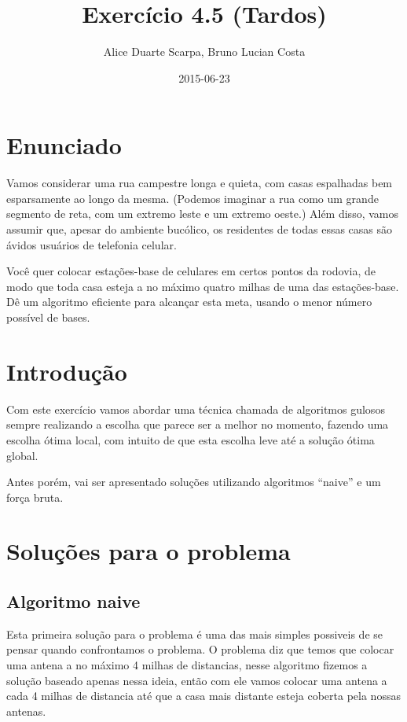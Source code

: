 \documentclass[11pt]{article}
\author{Alice Duarte Scarpa, Bruno Lucian Costa}
\date{2015-06-23}
\title{Exercício 4.5 (Tardos)}
\begin{document}
\maketitle

\section{Enunciado}
\label{sec-1}

Vamos considerar uma rua campestre longa e quieta, com casas
espalhadas bem esparsamente ao longo da mesma. (Podemos imaginar a
rua como um grande segmento de reta, com um extremo leste e um
extremo oeste.) Além disso, vamos assumir que, apesar do ambiente
bucólico, os residentes de todas essas casas são ávidos usuários de
telefonia celular.

Você quer colocar estações-base de celulares em certos pontos da
rodovia, de modo que toda casa esteja a no máximo quatro milhas de
uma das estações-base. Dê um algoritmo eficiente para alcançar esta
meta, usando o menor número possível de bases.

\section{Introdução}
\label{sec-2}
\label{sec-2}

Com este exercício vamos abordar uma técnica chamada de algoritmos
gulosos sempre realizando a escolha que parece ser a melhor no
momento, fazendo uma escolha ótima local, com intuito de que esta
escolha leve até a solução ótima global.

Antes porém, vai ser apresentado soluções utilizando algoritmos
``naive'' e um força bruta.


\section{Soluções para o problema}
\label{sec-3}
\label{sec-3}


\subsection{Algoritmo naive}
\label{sec-3-1}
\label{sec-3-1}

Esta primeira solução para o problema é uma das mais simples possiveis
de se pensar quando confrontamos o problema.  O problema diz que temos
que colocar uma antena a no máximo 4 milhas de distancias, nesse
algoritmo fizemos a solução baseado apenas nessa ideia, então com ele
vamos colocar uma antena a cada 4 milhas de distancia até que a casa
mais distante esteja coberta pela nossas antenas.
\end{document}
